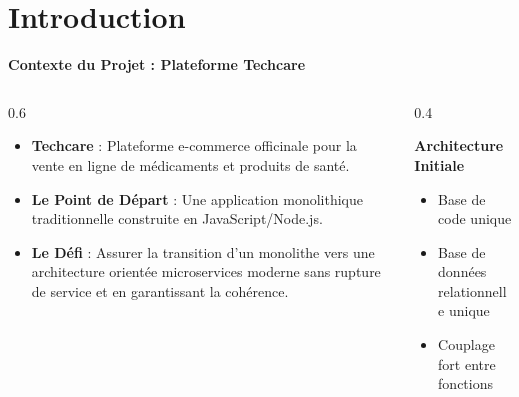 \documentclass[10pt,aspectratio=169]{beamer}
\begin{document}
\section{Introduction}

\begin{frame}{\textbf{Contexte du Projet : Plateforme Techcare}}
    \begin{columns}
        \begin{column}{0.6\textwidth}
            \begin{itemize}
                \item \textbf{Techcare} : Plateforme e-commerce officinale pour la vente en ligne de médicaments et produits de santé.
                \item \textbf{Le Point de Départ} : Une application monolithique traditionnelle construite en JavaScript/Node.js.
                \item \textbf{Le Défi} : Assurer la transition d'un monolithe vers une architecture orientée microservices moderne sans rupture de service et en garantissant la cohérence.
            \end{itemize}
        \end{column}
        \begin{column}{0.4\textwidth}
            \begin{block}{\textbf{Architecture Initiale}}
                \begin{itemize}
                    \item Base de code unique
                    \item Base de données relationnelle unique
                    \item Couplage fort entre fonctions
                \end{itemize}
            \end{block}
        \end{column}
    \end{columns}
\end{frame}
\end{document}
